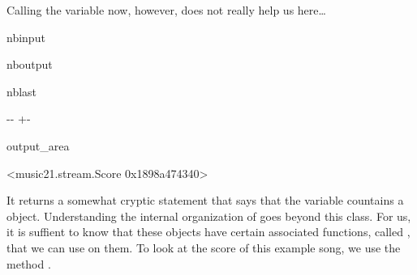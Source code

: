 \documentclass[letterpaper,10pt,english]{sphinxmanual}
\newlength\nbsphinxcodecellspacing
\begin{document}
\sphinxAtStartPar
Calling the variable  now, however, does not really help us here…

\begin{sphinxuseclass}{nbinput}
{
\begin{sphinxVerbatim}[commandchars=\\\{\}]
\llap{\color{nbsphinxin}[8]:\,\hspace{\fboxrule}\hspace{\fboxsep}}
\end{sphinxVerbatim}
}

\end{sphinxuseclass}
\begin{sphinxuseclass}{nboutput}
\begin{sphinxuseclass}{nblast}
{

\kern-\sphinxverbatimsmallskipamount\kern-\baselineskip
\kern+\FrameHeightAdjust\kern-\fboxrule
\vspace{\nbsphinxcodecellspacing}

\begin{sphinxuseclass}{output_area}
\begin{sphinxuseclass}{}


\begin{sphinxVerbatim}[commandchars=\\\{\}]
\llap{\color{nbsphinxout}[8]:\,\hspace{\fboxrule}\hspace{\fboxsep}}<music21.stream.Score 0x1898a474340>
\end{sphinxVerbatim}



\end{sphinxuseclass}
\end{sphinxuseclass}
}

\end{sphinxuseclass}
\end{sphinxuseclass}
\sphinxAtStartPar
It returns a somewhat cryptic statement that says that the variable countains a  object. Understanding the internal organization of  goes beyond this class. For us, it is suffient to know that these objects have certain associated functions, called , that we can use on them. To look at the score of this example song, we use the method .
\end{document}
